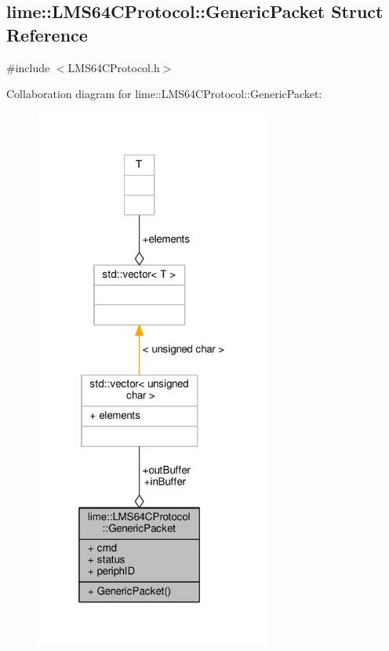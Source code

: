 \subsection{lime\+:\+:L\+M\+S64\+C\+Protocol\+:\+:Generic\+Packet Struct Reference}
\label{structlime_1_1LMS64CProtocol_1_1GenericPacket}


{\ttfamily \#include $<$L\+M\+S64\+C\+Protocol.\+h$>$}



Collaboration diagram for lime\+:\+:L\+M\+S64\+C\+Protocol\+:\+:Generic\+Packet\+:
\nopagebreak
\begin{figure}[H]
\begin{center}
\leavevmode
\includegraphics[width=220pt]{df/d10/structlime_1_1LMS64CProtocol_1_1GenericPacket__coll__graph}
\end{center}
\end{figure}
